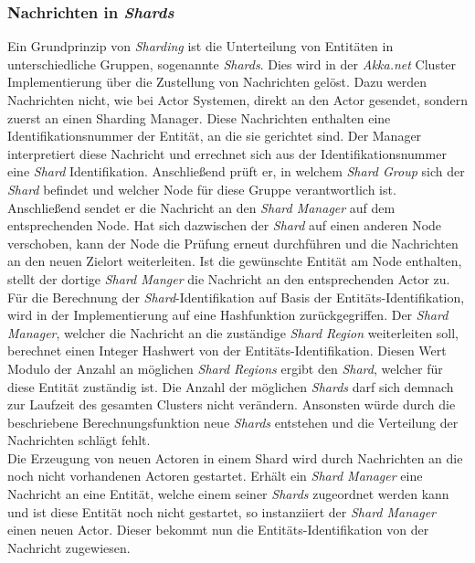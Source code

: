 \subsubsection{Nachrichten in \textit{Shards}}
Ein Grundprinzip von \textit{Sharding} ist die Unterteilung von Entitäten in unterschiedliche Gruppen, sogenannte \textit{Shards}. Dies wird in der \textit{Akka.net} Cluster Implementierung über die Zustellung von Nachrichten gelöst. Dazu werden Nachrichten nicht, wie bei Actor Systemen, direkt an den Actor gesendet, sondern zuerst an einen Sharding Manager. Diese Nachrichten enthalten eine Identifikationsnummer der Entität, an die sie gerichtet sind. Der Manager interpretiert diese Nachricht und errechnet sich aus der Identifikationsnummer eine \textit{Shard} Identifikation. Anschließend prüft er, in welchem \textit{Shard Group} sich der \textit{Shard} befindet und welcher Node für diese Gruppe verantwortlich ist. Anschließend sendet er die Nachricht an den \textit{Shard Manager} auf dem entsprechenden Node. Hat sich dazwischen der \textit{Shard} auf einen anderen Node verschoben, kann der Node die Prüfung erneut durchführen und die Nachrichten an den neuen Zielort weiterleiten. Ist  die gewünschte Entität am Node enthalten, stellt der dortige \textit{Shard Manger} die Nachricht an den entsprechenden Actor zu. \\
Für die Berechnung der \textit{Shard}-Identifikation auf Basis der Entitäts-Identifikation, wird in der Implementierung auf eine Hashfunktion zurückgegriffen. Der \textit{Shard Manager}, welcher die Nachricht an die zuständige \textit{Shard Region} weiterleiten soll, berechnet einen Integer Hashwert von der Entitäts-Identifikation. Diesen Wert Modulo der Anzahl an möglichen \textit{Shard Regions} ergibt den \textit{Shard}, welcher für diese Entität zuständig ist. Die Anzahl der möglichen \textit{Shards} darf sich demnach zur Laufzeit des gesamten Clusters nicht verändern. Ansonsten würde durch die beschriebene Berechnungsfunktion neue \textit{Shards} entstehen und die Verteilung der Nachrichten schlägt fehlt. \\
% 
% 
Die Erzeugung von neuen Actoren in einem Shard wird durch Nachrichten an die noch nicht vorhandenen Actoren gestartet. Erhält ein \textit{Shard Manager} eine Nachricht an eine Entität, welche einem seiner \textit{Shards} zugeordnet werden kann und ist diese Entität noch nicht gestartet, so instanziiert der \textit{Shard Manager} einen neuen Actor. Dieser bekommt nun die Entitäts-Identifikation von der Nachricht zugewiesen.
